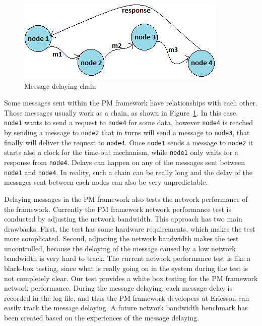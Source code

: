 \begin{figure}[hh!]
\centering
\includegraphics[width=.7\columnwidth]{figure/chaningMSG.png}
\caption{Message delaying chain \label{chaning}}
\end{figure}

Some messages sent within the PM framework have relationships with each other. Those messages usually work as a chain, as shown in Figure~\ref{chaning}. In this case, \texttt{node1} wants to send a request to \texttt{node4} for some data, however \texttt{node4} is reached by sending a message to \texttt{node2} that in turns will send a message to \texttt{node3}, that finally will deliver the request to  \texttt{node4}. 
Once \texttt{node1} sends a message to \texttt{node2} it starts also a clock for the time-out mechanism, while 
\texttt{node1} only waits for a response from \texttt{node4}. Delays can happen on any of the messages sent between \texttt{node1} and \texttt{node4}. In reality, such a chain can be really long and the delay of the messages sent between each nodes can also be very unpredictable.

Delaying messages in the PM framework also tests the network performance of the framework. %
Currently the PM framework network performance test is conducted by adjusting the network bandwidth. This approach has two main drawbacks. First, the test has some hardware requirements, which makes the test more complicated. Second, adjusting the network bandwidth makes the test uncontrolled, because the delaying of the message caused by a low network bandwidth is very hard to track. The current network performance test is like a black-box testing, since what is really going on in the system during the test is not completely clear. Our test provides a white box testing for the PM framework network performance. During the message delaying, each message delay is recorded in the log file, and thus the PM framework developers at Ericsson can easily track the message delaying. A future network bandwidth benchmark has been created based on the experiences of the message delaying.


